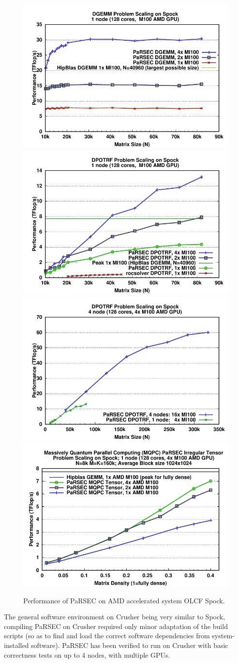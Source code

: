 \begin{figure}
\centering
\includegraphics[width=.45\linewidth]{projects/2.3.1-PMR/2.3.1.09-ParSEC/spock-gemm-pbscal1.pdf}
\includegraphics[width=.45\linewidth]{projects/2.3.1-PMR/2.3.1.09-ParSEC/spock-po-pbscal1.pdf}
\includegraphics[width=.45\linewidth]{projects/2.3.1-PMR/2.3.1.09-ParSEC/spock-po-pbscal4.pdf}
\includegraphics[width=.45\linewidth]{projects/2.3.1-PMR/2.3.1.09-ParSEC/spock-mqpc-density1.pdf}
\caption{Performance of PaRSEC on AMD accelerated system OLCF Spock.\label{fig:parsec:spock}}
\end{figure}

The general software environment on Crusher being very similar to Spock, compiling PaRSEC
on Crusher required only minor adaptation of the build scripts (so as to find
and load the correct software dependencies from system-installed software).
PaRSEC has been verified to run on Crusher with basic correctness tests on up to 4 nodes, 
with multiple GPUs.

